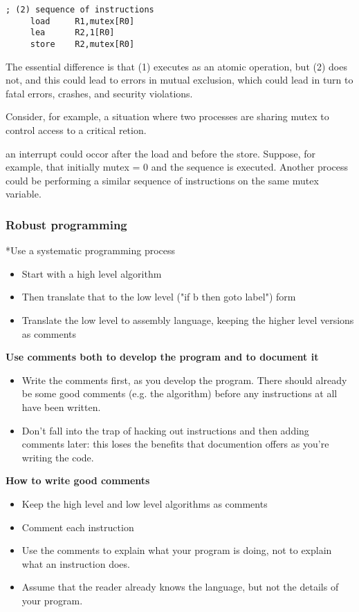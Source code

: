\documentclass[11pt]{article}
\begin{document}
\begin{verbatim}
; (2) sequence of instructions
     load     R1,mutex[R0]
     lea      R2,1[R0]
     store    R2,mutex[R0]
\end{verbatim}

The essential difference is that (1) executes as an atomic operation,
but (2) does not, and this could lead to errors in mutual exclusion,
which could lead in turn to fatal errors, crashes, and security
violations.

Consider, for example, a situation where two processes are sharing
mutex to control access to a critical retion.

  an interrupt could occor after the
load and before the store.  Suppose, for example, that initially mutex
= 0 and the sequence  is executed.
Another process could be performing a similar sequence of instructions
on the same mutex variable.

\subsubsection*{Robust programming}
\label{sec:org1f1caba}

*Use a systematic programming process

\begin{itemize}
\item Start with a high level algorithm
\item Then translate that to the low level ("if b then goto label") form
\item Translate the low level to assembly language, keeping the higher
level versions as comments
\end{itemize}

\textbf{Use comments both to develop the program and to document it}

\begin{itemize}
\item Write the comments first, as you develop the program.  There should
already be some good comments (e.g. the algorithm) before any
instructions at all have been written.
\item Don't fall into the trap of hacking out instructions and then adding
comments later: this loses the benefits that documention offers as
you're writing the code.
\end{itemize}

\textbf{How to write good comments}

\begin{itemize}
\item Keep the high level and low level algorithms as comments
\item Comment each instruction
\item Use the comments to explain what your program is doing, not to
explain what an instruction does.
\item Assume that the reader already knows the language, but not the
details of your program.
\end{itemize}
\end{document}
